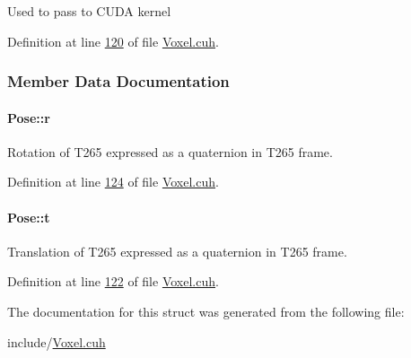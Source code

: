 Used to pass to C\+U\+DA kernel 

Definition at line \hyperlink{Voxel_8cuh_source_l00120}{120} of file \hyperlink{Voxel_8cuh_source}{Voxel.\+cuh}.



\subsubsection{Member Data Documentation}
\paragraph[{\texorpdfstring{r}{r}}]{ Pose\+::r}\hypertarget{structPose_ac86b5844a0203b03971005be99e59388}{}\label{structPose_ac86b5844a0203b03971005be99e59388}


Rotation of T265 expressed as a quaternion in T265 frame. 



Definition at line \hyperlink{Voxel_8cuh_source_l00124}{124} of file \hyperlink{Voxel_8cuh_source}{Voxel.\+cuh}.

\paragraph[{\texorpdfstring{t}{t}}]{ Pose\+::t}\hypertarget{structPose_aa87ab4baa5bab93b316c8ef417b6f1ef}{}\label{structPose_aa87ab4baa5bab93b316c8ef417b6f1ef}


Translation of T265 expressed as a quaternion in T265 frame. 



Definition at line \hyperlink{Voxel_8cuh_source_l00122}{122} of file \hyperlink{Voxel_8cuh_source}{Voxel.\+cuh}.



The documentation for this struct was generated from the following file\+:\begin{DoxyCompactItemize}
\item 
include/\hyperlink{Voxel_8cuh}{Voxel.\+cuh}\end{DoxyCompactItemize}
